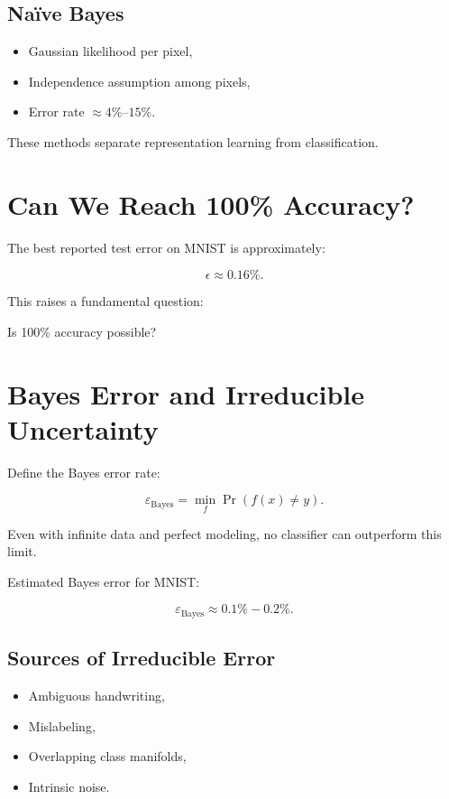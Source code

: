 \documentclass[11pt]{article}
\begin{document}
\subsection{Naïve Bayes}

\begin{itemize}
    \item Gaussian likelihood per pixel,
    \item Independence assumption among pixels,
    \item Error rate $\approx 4\%$--$15\%$.
\end{itemize}

These methods separate representation learning from classification.

\section{Can We Reach 100\% Accuracy?}

The best reported test error on MNIST is approximately:

\[
\epsilon \approx 0.16\%.
\]

This raises a fundamental question:

Is 100\% accuracy possible?

\section{Bayes Error and Irreducible Uncertainty}

Define the Bayes error rate:

\[
\varepsilon_{\text{Bayes}} = \min_f \Pr(f(x) \neq y).
\]

Even with infinite data and perfect modeling, no classifier can outperform this limit.

Estimated Bayes error for MNIST:

\[
\varepsilon_{\text{Bayes}} \approx 0.1\% - 0.2\%.
\]

\subsection{Sources of Irreducible Error}

\begin{itemize}
    \item Ambiguous handwriting,
    \item Mislabeling,
    \item Overlapping class manifolds,
    \item Intrinsic noise.
\end{itemize}
\end{document}
